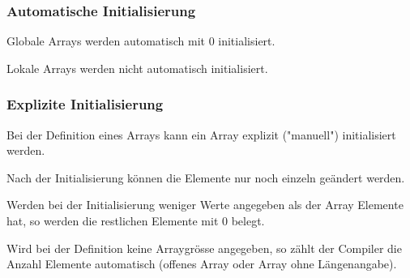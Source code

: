 \newpage%
		
		\vspace*{0.1cm}
		
		\begin{minipage}[t]{9 cm}
			\subsubsection{Automatische Initialisierung }	
				\begin{compactitem}
					\item Globale Arrays werden automatisch mit 0 initialisiert.
					\item Lokale Arrays werden nicht automatisch initialisiert.
				\end{compactitem}
				
			\subsubsection{Explizite Initialisierung }	
				\begin{compactitem}
					\item Bei der Definition eines Arrays kann ein Array explizit ("manuell") initialisiert werden.
					\item Nach der Initialisierung können die Elemente nur noch einzeln geändert werden.
				\end{compactitem}
				
				\begin{compactitem}
					\item Werden bei der Initialisierung weniger Werte angegeben als der Array Elemente hat, so werden die restlichen Elemente mit 0 belegt.
				\end{compactitem}
				
				\begin{compactitem}
					\item Wird bei der Definition keine Arraygrösse angegeben, so zählt der Compiler die Anzahl Elemente automatisch (offenes Array oder Array ohne Längenangabe).
				\end{compactitem}
				
		\end{minipage}
